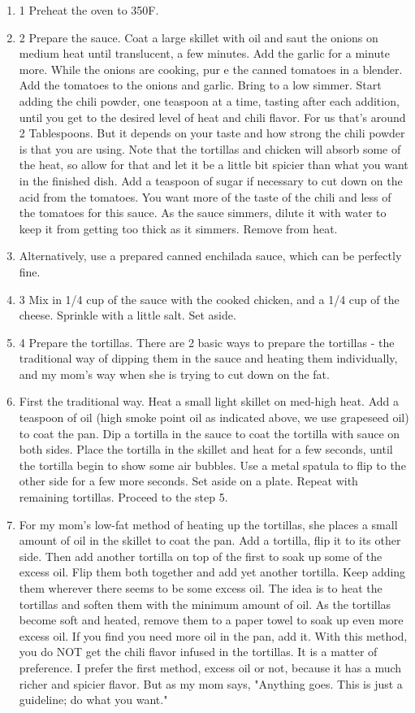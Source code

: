 \documentclass[11pt, twoside, openany]{book}
\begin{document}
\vspace{-3mm}\begin{enumerate}\setlength\itemsep{-1mm}
\item 1 Preheat the oven to 350F.
\item 2 Prepare the sauce. Coat a large skillet with oil and saut the onions on medium heat until translucent, a few minutes. Add the garlic for a minute more. While the onions are cooking, pur e the canned tomatoes in a blender. Add the tomatoes to the onions and garlic. Bring to a low simmer. Start adding the chili powder, one teaspoon at a time, tasting after each addition, until you get to the desired level of heat and chili flavor. For us that's around 2 Tablespoons. But it depends on your taste and how strong the chili powder is that you are using. Note that the tortillas and chicken will absorb some of the heat, so allow for that and let it be a little bit spicier than what you want in the finished dish. Add a teaspoon of sugar if necessary to cut down on the acid from the tomatoes. You want more of the taste of the chili and less of the tomatoes for this sauce. As the sauce simmers, dilute it with water to keep it from getting too thick as it simmers. Remove from heat.
\item Alternatively, use a prepared canned enchilada sauce, which can be perfectly fine.
\item 3 Mix in 1/4 cup of the sauce with the cooked chicken, and a 1/4 cup of the cheese. Sprinkle with a little salt. Set aside.
\item 4 Prepare the tortillas. There are 2 basic ways to prepare the tortillas - the traditional way of dipping them in the sauce and heating them individually, and my mom's way when she is trying to cut down on the fat.
\item  First the traditional way. Heat a small light skillet on med-high heat. Add a teaspoon of oil (high smoke point oil as indicated above, we use grapeseed oil) to coat the pan. Dip a tortilla in the sauce to coat the tortilla with sauce on both sides. Place the tortilla in the skillet and heat for a few seconds, until the tortilla begin to show some air bubbles. Use a metal spatula to flip to the other side for a few more seconds. Set aside on a plate. Repeat with remaining tortillas. Proceed to the step 5.
\item  For my mom's low-fat method of heating up the tortillas, she places a small amount of oil in the skillet to coat the pan. Add a tortilla, flip it to its other side. Then add another tortilla on top of the first to soak up some of the excess oil. Flip them both together and add yet another tortilla. Keep adding them wherever there seems to be some excess oil. The idea is to heat the tortillas and soften them with the minimum amount of oil. As the tortillas become soft and heated, remove them to a paper towel to soak up even more excess oil. If you find you need more oil in the pan, add it. With this method, you do NOT get the chili flavor infused in the tortillas. It is a matter of preference. I prefer the first method, excess oil or not, because it has a much richer and spicier flavor. But as my mom says, "Anything goes. This is just a guideline; do what you want." 

\end{enumerate}
\end{document}
